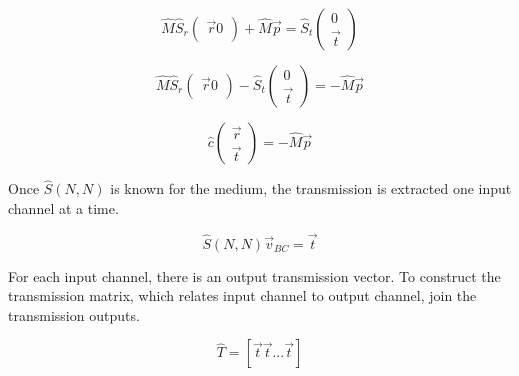 \begin{equation}
\hat{M}\hat{S}_r
\left( \begin{array}{c}
\vec{r}
0 \\
\end{array} \right)
+\hat{M}\vec{p} = \hat{S}_t 
\left( \begin{array}{c}
0 \\
\vec{t}
\end{array} \right)
\end{equation}

\begin{equation}
\hat{M}\hat{S}_r
\left( \begin{array}{c}
\vec{r}
0 \\
\end{array} \right)
-\hat{S}_t 
\left( \begin{array}{c}
0 \\
\vec{t}
\end{array} \right) =
-\hat{M}\vec{p}
\end{equation}

\begin{equation}
\hat{c}
\left( \begin{array}{c}
\vec{r} \\
\vec{t}
\end{array} \right)
= -\hat{M}\vec{p}
\end{equation}

Once $\hat{S}(N,N)$ is known for the medium, the transmission is extracted one input channel at a time.

\begin{equation}
\hat{S}(N,N) \vec{v}_{BC} = \vec{t}
\end{equation}

For each input channel, there is an output transmission vector. To construct the transmission matrix, which relates input channel to output channel, join the transmission outputs.

\begin{equation}
\hat{T} = [ \vec{t} \vec{t} ... \vec{t} ]
\label{transmissionMatrix}
\end{equation}
